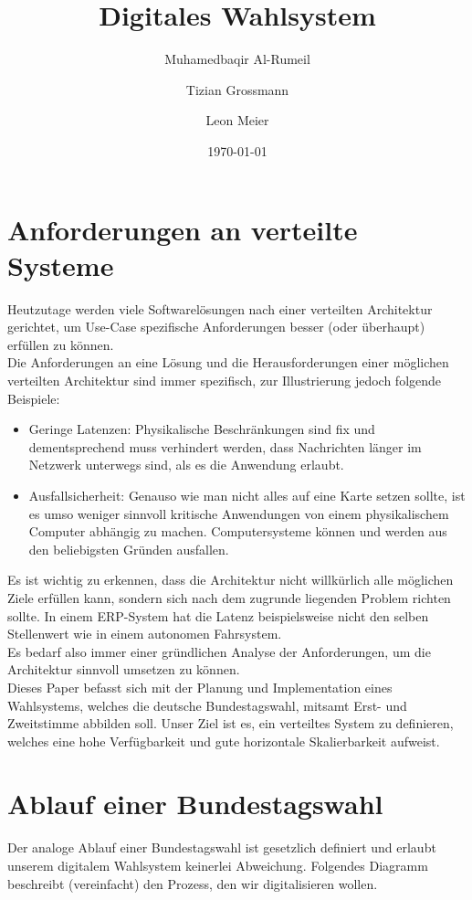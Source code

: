 \documentclass{article}  %
\title{Digitales Wahlsystem}
\author{
    Muhamedbaqir Al-Rumeil \and 
    Tizian Grossmann \and 
    Leon Meier
    }
\date{\today}  %
\begin{document}
\maketitle
\newpage

\tableofcontents
\newpage

\section{Anforderungen an verteilte Systeme}

Heutzutage werden viele Softwarelösungen nach einer verteilten Architektur gerichtet, um Use-Case spezifische Anforderungen besser (oder überhaupt) erfüllen zu können. \\
Die Anforderungen an eine Lösung und die Herausforderungen einer möglichen verteilten Architektur sind immer spezifisch, zur Illustrierung jedoch folgende Beispiele: 
\begin{itemize}
    \item Geringe Latenzen: Physikalische Beschränkungen sind fix und dementsprechend muss verhindert werden, dass Nachrichten länger im Netzwerk unterwegs sind, als es die Anwendung erlaubt.

    \item Ausfallsicherheit: Genauso wie man nicht alles auf eine Karte setzen sollte, ist es umso weniger sinnvoll kritische Anwendungen von einem physikalischem Computer abhängig zu machen. Computersysteme können und werden aus den beliebigsten Gründen ausfallen.
\end{itemize} 

Es ist wichtig zu erkennen, dass die Architektur nicht willkürlich alle möglichen Ziele erfüllen kann, sondern sich nach dem zugrunde liegenden Problem richten sollte. In einem ERP-System hat die Latenz beispielsweise nicht den selben Stellenwert wie in einem autonomen Fahrsystem. \\
Es bedarf also immer einer gründlichen Analyse der Anforderungen, um die Architektur sinnvoll umsetzen zu können. \\


Dieses Paper befasst sich mit der Planung und Implementation eines Wahlsystems, welches die deutsche Bundestagswahl, mitsamt Erst- und Zweitstimme abbilden soll. Unser Ziel ist es, ein verteiltes System zu definieren, welches eine hohe Verfügbarkeit und gute horizontale Skalierbarkeit aufweist.
  
\newpage

\section{Ablauf einer Bundestagswahl}
Der analoge Ablauf einer Bundestagswahl ist gesetzlich definiert und erlaubt unserem digitalem Wahlsystem keinerlei Abweichung. Folgendes Diagramm beschreibt (vereinfacht) den Prozess, den wir digitalisieren wollen. \\
\end{document}
